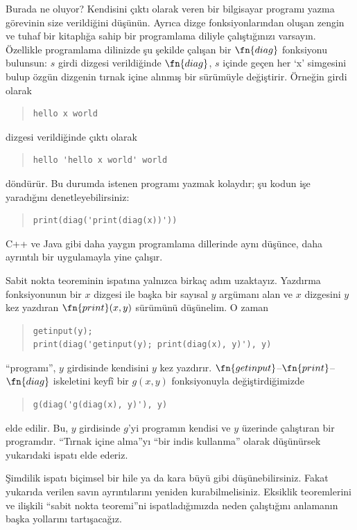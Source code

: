 \begin{explain}
Burada ne oluyor? Kendisini çıktı olarak veren bir bilgisayar programı yazma
görevinin size verildiğini düşünün. Ayrıca dizge fonksiyonlarından oluşan
zengin ve tuhaf bir kitaplığa sahip bir programlama diliyle çalıştığınızı
varsayın. Özellikle programlama dilinizde şu şekilde çalışan bir
$\fn{diag}$ fonksiyonu bulunsun: $s$ girdi dizgesi verildiğinde $\fn{diag}$,
$s$ içinde geçen her `x' simgesini bulup özgün dizgenin tırnak içine alınmış
bir sürümüyle değiştirir. Örneğin girdi olarak
\begin{quote}
\begin{verbatim}
hello x world
\end{verbatim}
\end{quote}
dizgesi verildiğinde çıktı olarak
\begin{quote}
\begin{verbatim}
hello 'hello x world' world
\end{verbatim}
\end{quote}
döndürür. Bu durumda istenen programı yazmak kolaydır; şu kodun işe
yaradığını denetleyebilirsiniz:
\begin{quote}
\begin{verbatim}
print(diag('print(diag(x))'))
\end{verbatim}
\end{quote}
C++ ve Java gibi daha yaygın programlama dillerinde aynı düşünce, daha
ayrıntılı bir uygulamayla yine çalışır.

Sabit nokta teoreminin ispatına yalnızca birkaç adım uzaktayız. Yazdırma
fonksiyonunun bir $x$ dizgesi ile başka bir sayısal $y$ argümanı alan ve
$x$ dizgesini $y$ kez yazdıran $\fn{print}(x,y)$ sürümünü düşünelim. O zaman
\begin{quote}
\begin{verbatim}
getinput(y);
print(diag('getinput(y); print(diag(x), y)'), y)
\end{verbatim}
\end{quote}
``programı'', $y$ girdisinde kendisini $y$ kez yazdırır.
$\fn{getinput}$--$\fn{print}$--$\fn{diag}$ iskeletini keyfî bir $g(x,y)$
fonksiyonuyla değiştirdiğimizde
\begin{quote}
\begin{verbatim}
g(diag('g(diag(x), y)'), y)
\end{verbatim}
\end{quote}
elde edilir. Bu, $y$ girdisinde $g$'yi programın kendisi ve $y$ üzerinde
çalıştıran bir programdır. ``Tırnak içine alma''yı ``bir indis kullanma''
olarak düşünürsek yukarıdaki ispatı elde ederiz.

Şimdilik ispatı biçimsel bir hile ya da kara büyü gibi düşünebilirsiniz.
Fakat yukarıda verilen savın ayrıntılarını yeniden kurabilmelisiniz.
Eksiklik teoremlerini ve ilişkili ``sabit nokta teoremi''ni ispatladığımızda
neden çalıştığını anlamanın başka yollarını tartışacağız.
\end{explain}


